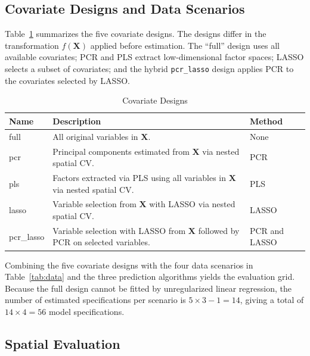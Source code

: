 \documentclass[pdflatex,sn-apa]{sn-jnl}
\begin{document}
\subsection{Covariate Designs and Data Scenarios}

Table~\ref{tab:designs_summary} summarizes the five covariate designs. The designs differ in the transformation $f(\mathbf{X})$ applied before estimation. The ``full'' design uses all available covariates; PCR and PLS extract low-dimensional factor spaces; LASSO selects a subset of covariates; and the hybrid \texttt{pcr\_lasso} design applies PCR to the covariates selected by LASSO.

\begin{table}[!htbp]
    \centering
    \small
    \begin{tabular}{lp{10cm}l}
        \toprule
        \textbf{Name} & \textbf{Description} & \textbf{Method} \\
        \midrule
        full & All original variables in $\mathbf{X}$. & None \\
        pcr & Principal components estimated from $\mathbf{X}$ via nested spatial CV. & PCR \\
        pls & Factors extracted via PLS using all variables in $\mathbf{X}$ via nested spatial CV. & PLS \\
        lasso & Variable selection from $\mathbf{X}$ with LASSO via nested spatial CV. & LASSO \\
        pcr\_lasso & Variable selection with LASSO from $\mathbf{X}$ followed by PCR on selected variables. & PCR and LASSO \\
        \bottomrule
    \end{tabular}
    \caption{Covariate Designs}
    \label{tab:designs_summary}
\end{table}

Combining the five covariate designs with the four data scenarios in Table~\ref{tab:data} and the three prediction algorithms yields the evaluation grid. Because the full design cannot be fitted by unregularized linear regression, the number of estimated specifications per scenario is $5 \times 3 - 1 = 14$, giving a total of $14 \times 4 = 56$ model specifications.

\subsection{Spatial Evaluation}
\label{subsec:evaluation}
\end{document}
